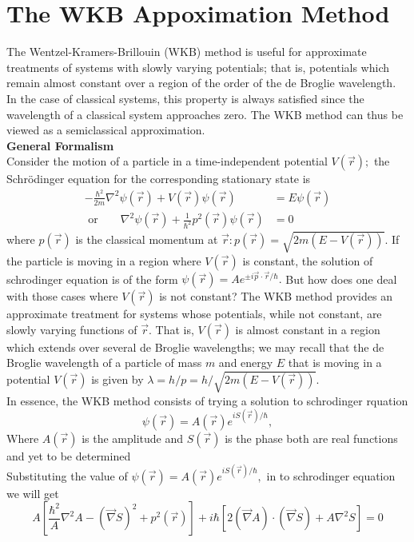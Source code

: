 \section{The WKB Appoximation Method}
The Wentzel-Kramers-Brillouin (WKB) method is useful for approximate treatments of systems with slowly varying potentials; that is, potentials which remain almost constant over a region of the order of the de Broglie wavelength. In the case of classical systems, this property is always satisfied since the wavelength of a classical system approaches zero. The WKB method can thus be viewed as a semiclassical approximation.\\
\textbf{General Formalism}\\
Consider the motion of a particle in a time-independent potential $V(\vec{r}) ;$ the Schrödinger equation for the corresponding stationary state is
	$$
	\begin{aligned}
	-\frac{\hbar^{2}}{2 m} \nabla^{2} \psi(\vec{r})+V(\vec{r}) \psi(\vec{r})&=E \psi(\vec{r})\\
\text{	or}\qquad
	\nabla^{2} \psi(\vec{r})+\frac{1}{\hbar^{2}} p^{2}(\vec{r}) \psi(\vec{r})&=0
\end{aligned}
$$
where $p(\vec{r})$ is the classical momentum at $\vec{r}: p(\vec{r})=\sqrt{2 m(E-V(\vec{r}))}$. If the particle is moving in a region where $V(\vec{r})$ is constant, the solution of schrodinger equation is of the form $\psi(\vec{r})=A e^{\pm i \vec{p} \cdot \vec{r} / \hbar} .$ But how does one deal with those cases where $V(\vec{r})$ is not constant? The WKB method provides an approximate treatment for systems whose potentials, while not constant, are slowly varying functions of $\vec{r}$. That is, $V(\vec{r})$ is almost constant in a region which extends over several de Broglie wavelengths; we may recall that the de Broglie wavelength of a particle of mass $m$ and energy $E$ that is moving in a potential $V(\vec{r})$ is given by $\lambda=h / p=h / \sqrt{2 m(E-V(\vec{r}))}$.\\
In essence, the WKB method consists of trying a solution to schrodinger rquation
$$
\psi(\vec{r})=A(\vec{r}) e^{i S(\vec{r}) / \hbar},
$$
Where $A(\vec{r})$ is the amplitude and $S(\vec{r})$ is the phase both are real functions and yet to be determined\\
Substituting the value of $
\psi(\vec{r})=A(\vec{r}) e^{i S(\vec{r}) / \hbar},
$ in to schrodinger equation we will get\\
$$A\left[\frac{\hbar^{2}}{A} \nabla^{2} A-(\vec{\nabla} S)^{2}+p^{2}(\vec{r})\right]+i \hbar\left[2(\vec{\nabla} A) \cdot(\vec{\nabla} S)+A \nabla^{2} S\right]=0$$
